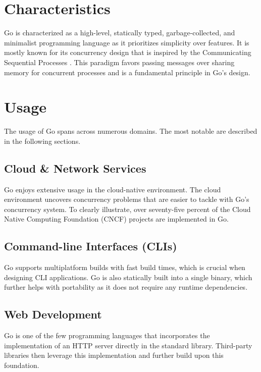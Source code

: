 \documentclass[
  digital,
  color,
  oneside,
  nosansbold,
  nocolorbold,
  nolof,
  nolot,
]{fithesis4}
\begin{document}
\section{Characteristics}\label{go-characteristics}

Go is characterized as a high-level, statically typed, garbage-collected, and minimalist programming language as it prioritizes simplicity over features. It is mostly known for its concurrency design that is inspired by the Communicating Sequential Processes \cite{csp}. This paradigm favors passing messages over sharing memory for concurrent processes and is a fundamental principle in Go's design.

\section{Usage}\label{go-usage}

The usage of Go spans across numerous domains. The most notable are described in the following sections.

\subsection{Cloud \& Network Services}

Go enjoys extensive usage in the cloud-native environment. The cloud environment uncovers concurrency problems that are easier to tackle with Go's concurrency system. To clearly illustrate, over seventy-five percent of the Cloud Native Computing Foundation (CNCF)\cite{cncf} projects are implemented in Go. \cite{go-cloud}

\subsection{Command-line Interfaces (CLIs)}\label{go-cli}

Go supports multiplatform builds with fast build times, which is crucial when designing CLI applications. Go is also statically built into a single binary, which further helps with portability as it does not require any runtime dependencies. \cite{go-cli}

\subsection{Web Development}\label{go-web}

Go is one of the few programming languages that incorporates the implementation of an HTTP server directly in the standard library. Third-party libraries then leverage this implementation and further build upon this foundation. 
\end{document}
